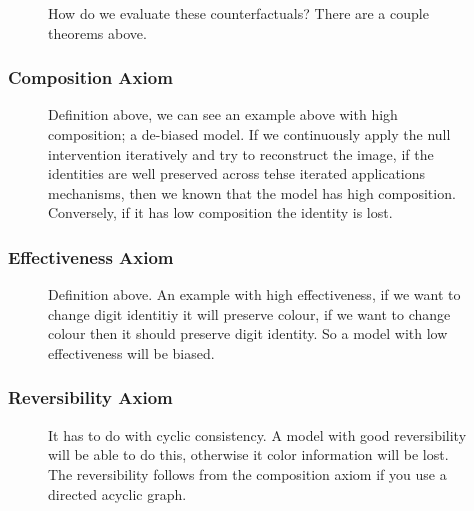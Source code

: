 \documentclass[11pt]{article}
\begin{document}
\begin{figure}[H]
    \centering
    \caption{How do we evaluate these counterfactuals? There are a couple theorems above.}
\end{figure}

\subsubsection{Composition Axiom}

\begin{figure}[H]
    \centering
    \caption{Definition above, we can see an example above with high composition; a de-biased model. If we continuously apply the null intervention iteratively and try to reconstruct the image, if the identities are well preserved across tehse iterated applications mechanisms, then we known that the model has high composition. \\
    Conversely, if it has low composition the identity is lost.}
\end{figure}

\subsubsection{Effectiveness Axiom}

\begin{figure}[H]
    \centering
    \caption{Definition above. An example with high effectiveness, if we want to change digit identitiy it will preserve colour, if we want to change colour then it should preserve digit identity. So a model with low effectiveness will be biased.}
\end{figure}

\subsubsection{Reversibility Axiom}

\begin{figure}[H]
    \centering
    \caption{It has to do with cyclic consistency. A model with good reversibility will be able to do this, otherwise it color information will be lost. The reversibility follows from the composition axiom if you use a directed acyclic graph.}
\end{figure}
\end{document}
